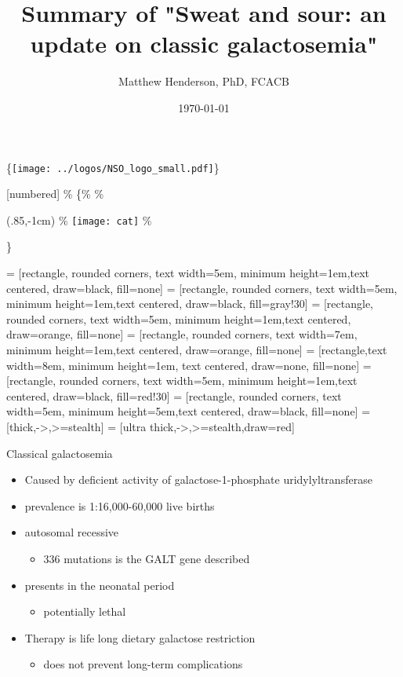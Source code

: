 \documentclass[presentation, smaller]{beamer}
\author{Matthew Henderson, PhD, FCACB}
\date{\today}
\title{Summary of "Sweat and sour: an update on classic galactosemia"}
\institute[NSO]{Newborn Screening Ontario}
\begin{document}
\maketitle

\begin{LaTeX}
\logo\{\texttt{[image: ../logos/NSO\_logo\_small.pdf]}\}

\vspace{220pt}
\beamertemplatenavigationsymbolsempty
{}[numbered]
\% \{\%
\% \begin{textblock*}{100mm}(.85\textwidth,-1cm)
\% \texttt{[image: cat]}
\% \end{textblock*}\}


 = [rectangle, rounded corners, text width=5em, minimum height=1em,text centered, draw=black, fill=none]
 = [rectangle, rounded corners, text width=5em, minimum height=1em,text centered, draw=black, fill=gray!30]
 = [rectangle, rounded corners, text width=5em, minimum height=1em,text centered, draw=orange, fill=none]
 = [rectangle, rounded corners, text width=7em, minimum height=1em,text centered, draw=orange, fill=none]
 = [rectangle,text width=8em, minimum height=1em, text centered, draw=none, fill=none]
 = [rectangle, rounded corners, text width=5em, minimum height=1em,text centered, draw=black, fill=red!30]
 = [rectangle, rounded corners, text width=5em, minimum height=5em,text centered, draw=black, fill=none]
 = [thick,->,>=stealth]
 = [ultra thick,->,>=stealth,draw=red]
\end{LaTeX}




\begin{frame}[label={sec:orga03d061}]{Classical galactosemia}
\begin{itemize}
\item Caused by deficient activity of galactose-1-phosphate uridylyltransferase
\item prevalence is 1:16,000-60,000 live births
\item autosomal recessive
\begin{itemize}
\item 336 mutations is the GALT gene described
\end{itemize}

\item presents in the neonatal period
\begin{itemize}
\item potentially lethal
\end{itemize}

\item Therapy is life long dietary galactose restriction
\begin{itemize}
\item does not prevent long-term complications
\end{itemize}
\end{itemize}
\end{frame}
\end{document}

